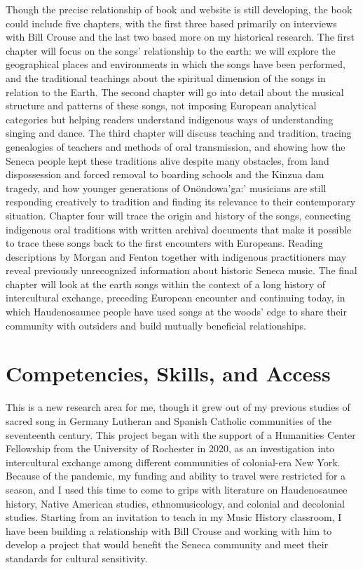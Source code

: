 \documentclass{neh}
\begin{document}
Though the precise relationship of book and website is still developing, the
book could include five chapters, with the first three based primarily on
interviews with Bill Crouse and the last two based more on my historical
research.
The first chapter will focus on the songs' relationship to the earth:
we will explore the geographical places and environments in which the songs
have been performed, and the traditional teachings about the spiritual
dimension of the songs in relation to the Earth.
The second chapter will go into detail about the musical structure and
patterns of these songs, not imposing European analytical categories but
helping readers understand indigenous ways of understanding singing and dance.
The third chapter will discuss teaching and tradition, tracing genealogies of
teachers and methods of oral transmission, and showing how the Seneca people
kept these traditions alive despite many obstacles, from land dispossession
and forced removal to boarding schools and the Kinzua dam tragedy, and how
younger generations of Onöndowa’ga:’ musicians are still responding creatively
to tradition and finding its relevance to their contemporary situation.
Chapter four will trace the origin and history of the songs, connecting
indigenous oral traditions with written archival documents that make it
possible to trace these songs back to the first encounters with Europeans.
Reading descriptions by Morgan and Fenton together with indigenous
practitioners may reveal previously unrecognized information about historic
Seneca music.
The final chapter will look at the earth songs within the context of a long
history of intercultural exchange, preceding European encounter and continuing
today, in which Haudenosaunee people have used songs at the woods' edge to
share their community with outsiders and build mutually beneficial
relationships.
\clearpage
\section{Competencies, Skills, and Access}

This is a new research area for me, though it grew out of my previous studies
of sacred song in Germany Lutheran and Spanish Catholic communities of the
seventeenth century.
This project began with the support of a Humanities Center Fellowship from the
University of Rochester in 2020, as an investigation into intercultural
exchange among different communities of colonial-era New York. 
Because of the pandemic, my funding and ability to travel were restricted for
a season, and I used this time to come to grips with literature on
Haudenosaunee history, Native American studies, ethnomusicology, and colonial
and decolonial studies.
Starting from an invitation to teach in my Music History classroom, I have
been building a relationship with Bill Crouse and working with him to develop
a project that would benefit the Seneca community and meet their standards for
cultural sensitivity.
\end{document}

